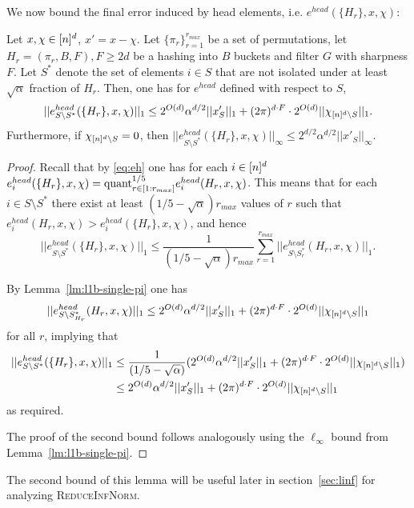 We now bound the final error induced by head elements, i.e. $e^{head}(\{H_r\}, x, \chi)$:
\begin{lemma}\label{lm:eh-s-sstar}
Let $x, \chi\in {[n]^d}$, $x'=x-\chi$.  Let $\{\pi_r\}_{r=1}^{r_{max}}$ be a set of permutations, let $H_r=(\pi_r, B, F), F\geq 2d$ be a hashing into $B$ buckets and filter $G$ with sharpness $F$. Let $S^*$ denote the set of elements $i\in S$ that are not isolated under at least $\sqrt{\alpha}$  fraction of $H_r$. Then, one has for $e^{head}$ defined with respect to $S$, 
$$
||e^{head}_{S\setminus S^*}(\{H_r\}, x, \chi)||_1\leq 2^{O(d)}\alpha^{d/2} ||x'_S||_1+(2\pi)^{d\cdot F} \cdot 2^{O(d)} ||\chi_{{[n]^d}\setminus S}||_1.
$$
Furthermore, if $\chi_{{[n]^d}\setminus S}=0$, then $||e^{head}_{S\setminus S^*}(\{H_r\}, x, \chi)||_\infty\leq 2^{d/2}\alpha^{d/2} ||x'_S||_\infty$.
\end{lemma}
\begin{proof}
Recall that by \eqref{eq:eh} one has for each $i\in {[n]^d}$ $e^{head}_i(\{H_r\}, x, \chi)=\text{quant}^{1/5}_{r\in [1:r_{max}]} e^{head}_i(H_r, x, \chi)$. This means that for each $i\in S\setminus S^*$ there exist at least $(1/5-\sqrt{\alpha})r_{max}$ values of $r$ such that 
$e^{head}_i(H_r, x, \chi)>e^{head}_i(\{H_r\}, x, \chi)$, and hence
$$
||e^{head}_{S\setminus S^*}(\{H_r\}, x, \chi)||_1\leq \frac1{(1/5-\sqrt{\alpha})r_{max}}\sum_{r=1}^{r_{max}} ||e^{head}_{S\setminus S^*_r}(H_r, x, \chi)||_1.
$$

By Lemma~\ref{lm:l1b-single-pi} one has
$$
||e^{head}_{S\setminus S^*_{H_r}}(H_r, x, \chi)||_1\leq 2^{O(d)}\alpha^{d/2} ||x'_S||_1+(2\pi)^{d\cdot F} \cdot 2^{O(d)} ||\chi_{{[n]^d}\setminus S}||_1
$$
for all $r$, implying that 
\begin{equation*}
\begin{split}
||e^{head}_{S\setminus S^*}(\{H_r\}, x, \chi)||_1&\leq \frac{1}{(1/5-\sqrt{\alpha})}(2^{O(d)}\alpha^{d/2} ||x'_S||_1+(2\pi)^{d\cdot F} \cdot 2^{O(d)} ||\chi_{{[n]^d}\setminus S}||_1)\\
&\leq 2^{O(d)}\alpha^{d/2} ||x'_S||_1+(2\pi)^{d\cdot F} \cdot 2^{O(d)} ||\chi_{{[n]^d}\setminus S}||_1
\end{split}
\end{equation*}
as required.

The proof of the second bound follows analogously using the $\ell_\infty$ bound from Lemma~\ref{lm:l1b-single-pi}.
\end{proof}
\begin{remark}
The second bound of this lemma will be useful later in section~\ref{sec:linf} for analyzing \textsc{ReduceInfNorm}.
\end{remark}


